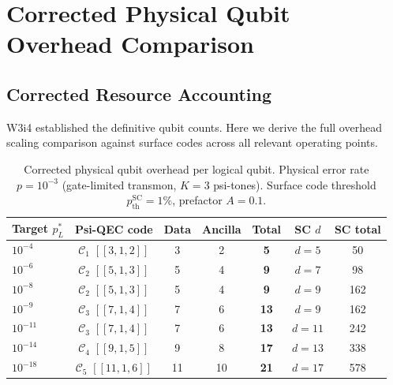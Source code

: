 \documentclass[11pt]{article}
\theoremstyle{definition}
\theoremstyle{remark}
\begin{document}
\section{Corrected Physical Qubit Overhead Comparison}
\label{sec:overhead}

\subsection{Corrected Resource Accounting}
\label{sec:resource-accounting}

W3i4 established the definitive qubit counts.  Here we derive the full
overhead scaling comparison against surface codes across all relevant
operating points.

\begin{table}[h]
\centering
\caption{Corrected physical qubit overhead per logical qubit.
  Physical error rate $p = 10^{-3}$ (gate-limited transmon, $K=3$ psi-tones).
  Surface code threshold $p_{\mathrm{th}}^{\mathrm{SC}} = 1\%$,
  prefactor $A = 0.1$.}
\label{tab:overhead-corrected}
\begin{tabular}{@{}lcccccc@{}}
\toprule
Target $p_L^*$ & Psi-QEC code & Data & Ancilla & Total & SC $d$ & SC total \\
\midrule
$10^{-4}$ & $\mathcal{C}_1$ $[[3,1,2]]$ & 3 & 2 & \textbf{5} & $d=5$ & 50 \\
$10^{-6}$ & $\mathcal{C}_2$ $[[5,1,3]]$ & 5 & 4 & \textbf{9} & $d=7$ & 98 \\
$10^{-8}$ & $\mathcal{C}_2$ $[[5,1,3]]$ & 5 & 4 & \textbf{9} & $d=9$ & 162 \\
$10^{-9}$ & $\mathcal{C}_3$ $[[7,1,4]]$ & 7 & 6 & \textbf{13} & $d=9$ & 162 \\
$10^{-11}$ & $\mathcal{C}_3$ $[[7,1,4]]$ & 7 & 6 & \textbf{13} & $d=11$ & 242 \\
$10^{-14}$ & $\mathcal{C}_4$ $[[9,1,5]]$ & 9 & 8 & \textbf{17} & $d=13$ & 338 \\
$10^{-18}$ & $\mathcal{C}_5$ $[[11,1,6]]$ & 11 & 10 & \textbf{21} & $d=17$ & 578 \\
\bottomrule
\end{tabular}
\end{table}
\end{document}
